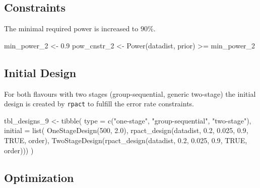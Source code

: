 \documentclass[
]{book}
\newenvironment{Shaded}{\begin{snugshade}}{\end{snugshade}}
\newcommand{\AttributeTok}[1]{\textcolor[rgb]{0.77,0.63,0.00}{#1}}
\newcommand{\ConstantTok}[1]{\textcolor[rgb]{0.00,0.00,0.00}{#1}}
\newcommand{\DecValTok}[1]{\textcolor[rgb]{0.00,0.00,0.81}{#1}}
\newcommand{\FloatTok}[1]{\textcolor[rgb]{0.00,0.00,0.81}{#1}}
\newcommand{\FunctionTok}[1]{\textcolor[rgb]{0.00,0.00,0.00}{#1}}
\newcommand{\NormalTok}[1]{#1}
\newcommand{\OtherTok}[1]{\textcolor[rgb]{0.56,0.35,0.01}{#1}}
\newcommand{\SpecialCharTok}[1]{\textcolor[rgb]{0.00,0.00,0.00}{#1}}
\newcommand{\StringTok}[1]{\textcolor[rgb]{0.31,0.60,0.02}{#1}}
\begin{document}
\hypertarget{constraints-8}{%
\subsection{Constraints}\label{constraints-8}}

The minimal required power is increased to \(90\%\).

\begin{Shaded}
\begin{Highlighting}[]
\NormalTok{min\_power\_2 }\OtherTok{\textless{}{-}} \FloatTok{0.9}
\NormalTok{pow\_cnstr\_2 }\OtherTok{\textless{}{-}} \FunctionTok{Power}\NormalTok{(datadist, prior) }\SpecialCharTok{\textgreater{}=}\NormalTok{ min\_power\_2}
\end{Highlighting}
\end{Shaded}

\hypertarget{initial-design-6}{%
\subsection{Initial Design}\label{initial-design-6}}

For both flavours with two stages (group-sequential, generic two-stage)
the initial design is created by \texttt{rpact} to fulfill the error rate constraints.

\begin{Shaded}
\begin{Highlighting}[]
\NormalTok{tbl\_designs\_9 }\OtherTok{\textless{}{-}} \FunctionTok{tibble}\NormalTok{(}
    \AttributeTok{type    =} \FunctionTok{c}\NormalTok{(}\StringTok{"one{-}stage"}\NormalTok{, }\StringTok{"group{-}sequential"}\NormalTok{, }\StringTok{"two{-}stage"}\NormalTok{),}
    \AttributeTok{initial =} \FunctionTok{list}\NormalTok{(}
        \FunctionTok{OneStageDesign}\NormalTok{(}\DecValTok{500}\NormalTok{, }\FloatTok{2.0}\NormalTok{),}
        \FunctionTok{rpact\_design}\NormalTok{(datadist, }\FloatTok{0.2}\NormalTok{, }\FloatTok{0.025}\NormalTok{, }\FloatTok{0.9}\NormalTok{, }\ConstantTok{TRUE}\NormalTok{, order),}
        \FunctionTok{TwoStageDesign}\NormalTok{(}\FunctionTok{rpact\_design}\NormalTok{(datadist, }\FloatTok{0.2}\NormalTok{, }\FloatTok{0.025}\NormalTok{, }\FloatTok{0.9}\NormalTok{, }\ConstantTok{TRUE}\NormalTok{, order))) )}
\end{Highlighting}
\end{Shaded}

\hypertarget{optimization-7}{%
\subsection{Optimization}\label{optimization-7}}
\end{document}
